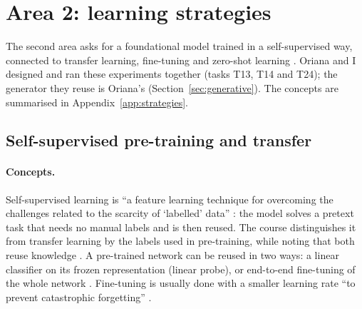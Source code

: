 \section{Area 2: learning strategies}\label{sec:strategies}

The second area asks for a foundational model trained in a self-supervised way, connected to transfer
learning, fine-tuning and zero-shot learning \cite{course_message_2011}. Oriana and I designed and ran
these experiments together (tasks T13, T14 and T24); the generator they reuse is Oriana's
(Section~\ref{sec:generative}). The concepts are summarised in Appendix~\ref{app:strategies}.

\subsection{Self-supervised pre-training and transfer}

\paragraph{Concepts.} Self-supervised learning is ``a feature learning technique for overcoming the
challenges related to the scarcity of `labelled' data'' \cite[p.~1]{soltanieh2022analysis}: the model solves a
pretext task that needs no manual labels and is then reused. The course distinguishes it from transfer
learning by the labels used in pre-training, while noting that both reuse knowledge
\cite{course_summary_0910}. A pre-trained network can be reused in two ways: a linear classifier on its
frozen representation (linear probe), or end-to-end fine-tuning of the whole network
\cite[p.~11]{radford2021learning}. Fine-tuning is usually done with a smaller learning rate ``to prevent
catastrophic forgetting'' \cite[p.~6]{soltanieh2023indistribution}.

